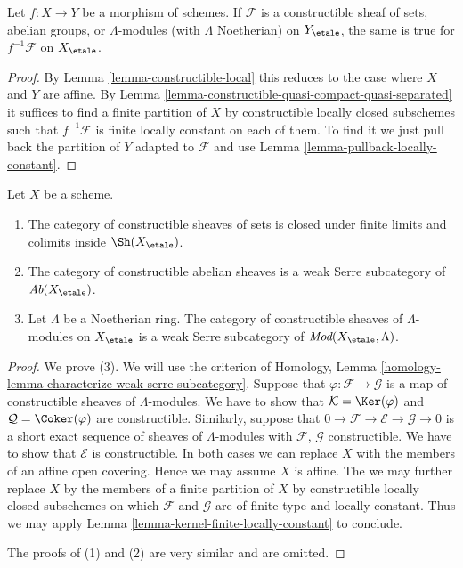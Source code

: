 \begin{lemma}
\label{lemma-pullback-constructible}
Let $f : X \to Y$ be a morphism of schemes. If $\mathcal{F}$ is a
constructible sheaf of sets, abelian groups, or $\Lambda$-modules
(with $\Lambda$ Noetherian) on $Y_\etale$, the same
is true for $f^{-1}\mathcal{F}$ on $X_\etale$.
\end{lemma}

\begin{proof}
By Lemma \ref{lemma-constructible-local} this reduces to the case
where $X$ and $Y$ are affine. By
Lemma \ref{lemma-constructible-quasi-compact-quasi-separated}
it suffices to find a finite partition of $X$ by constructible
locally closed subschemes such that $f^{-1}\mathcal{F}$ is finite locally
constant on each of them.
To find it we just pull back the partition of $Y$ adapted to
$\mathcal{F}$ and use
Lemma \ref{lemma-pullback-locally-constant}.
\end{proof}

\begin{lemma}
\label{lemma-constructible-abelian}
Let $X$ be a scheme.
\begin{enumerate}
\item The category of constructible sheaves of sets
is closed under finite limits and colimits inside $\Sh(X_\etale)$.
\item The category of constructible abelian sheaves is a
weak Serre subcategory of $\textit{Ab}(X_\etale)$.
\item Let $\Lambda$ be a Noetherian ring. The category of
constructible sheaves of $\Lambda$-modules on
$X_\etale$ is a weak Serre subcategory of
$\textit{Mod}(X_\etale, \Lambda)$.
\end{enumerate}
\end{lemma}

\begin{proof}
We prove (3). We will use the criterion of
Homology, Lemma \ref{homology-lemma-characterize-weak-serre-subcategory}.
Suppose that $\varphi : \mathcal{F} \to \mathcal{G}$
is a map of constructible sheaves of $\Lambda$-modules.
We have to show that $\mathcal{K} = \Ker(\varphi)$ and
$\mathcal{Q} = \Coker(\varphi)$ are constructible. 
Similarly, suppose that
$0 \to \mathcal{F} \to \mathcal{E} \to \mathcal{G} \to 0$
is a short exact sequence of sheaves of $\Lambda$-modules
with $\mathcal{F}$, $\mathcal{G}$ constructible. We have to show
that $\mathcal{E}$ is constructible.
In both cases we can replace $X$ with the members of an
affine open covering. Hence we may assume $X$ is affine.
The we may further replace $X$ by the members of a finite
partition of $X$ by constructible locally closed subschemes
on which $\mathcal{F}$ and $\mathcal{G}$ are of finite type and
locally constant. Thus we may apply
Lemma \ref{lemma-kernel-finite-locally-constant} to conclude.

\medskip\noindent
The proofs of (1) and (2) are very similar and are omitted.
\end{proof}

